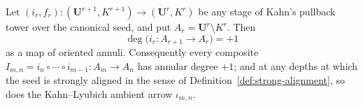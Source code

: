 \begin{lemma}
\label{lem:annular-degree}
Let \((i_r,f_r)\colon(\mathbf U^{r+1},K^{r+1})\to(\mathbf U^r,K^r)\) be any stage of Kahn's pullback tower over the canonical seed, and put \(A_r=\mathbf U^r\setminus K^r\).  Then
\[
 \deg\bigl(i_r\colon A_{r+1}\to A_r\bigr)=+1
\]
as a map of oriented annuli.  Consequently every composite \(I_{m,n}=i_n\circ\cdots\circ i_{m-1}\colon A_m\to A_n\) has annular degree \(+1\); and at any depths at which the seed is strongly aligned in the sense of Definition~\ref{def:strong-alignment}, so does the Kahn--Lyubich ambient arrow \(\iota_{m,n}\).
\end{lemma}

